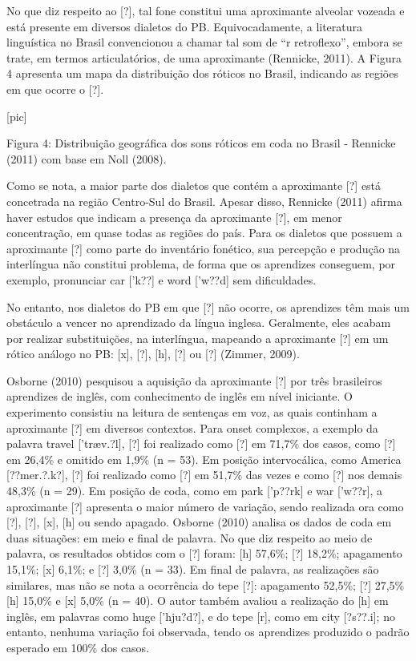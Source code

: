 No que diz respeito ao {[}?{]}, tal fone constitui uma aproximante
alveolar vozeada e est\'a presente em diversos dialetos do PB.
Equivocadamente, a literatura lingu\'istica no Brasil convencionou a
chamar tal som de ``r retroflexo'', embora se trate, em termos
articulat\'orios, de uma aproximante (Rennicke, 2011). A Figura 4
apresenta um mapa da distribui\c{c}\~ao dos r\'oticos no Brasil, indicando as
regi\~oes em que ocorre o {[}?{]}.

                                [pic]

Figura 4: Distribui\c{c}\~ao geogr\'afica dos sons r\'oticos em coda no Brasil -
Rennicke (2011) com base em Noll (2008).

Como se nota, a maior parte dos dialetos que cont\'em a aproximante
{[}?{]} est\'a concetrada na regi\~ao Centro-Sul do Brasil. Apesar disso,
Rennicke (2011) afirma haver estudos que indicam a presen\c{c}a da
aproximante {[}?{]}, em menor concentra\c{c}\~ao, em quase todas as regi\~oes do
pa\'is. Para os dialetos que possuem a aproximante {[}?{]} como parte do
invent\'ario fon\'etico, sua percep\c{c}\~ao e produ\c{c}\~ao na interl\'ingua n\~ao
constitui problema, de forma que os aprendizes conseguem, por exemplo,
pronunciar car {[}'k??{]} e word {[}'w??d{]} sem dificuldades.

No entanto, nos dialetos do PB em que {[}?{]} n\~ao ocorre, os aprendizes
t\^em mais um obst\'aculo a vencer no aprendizado da l\'ingua inglesa.
Geralmente, eles acabam por realizar substitui\c{c}\~oes, na interl\'ingua,
mapeando a aproximante {[}?{]} em um r\'otico an\'alogo no PB: {[}x{]},
{[}?{]}, {[}h{]}, {[}?{]} ou {[}?{]} (Zimmer, 2009).

Osborne (2010) pesquisou a aquisi\c{c}\~ao da aproximante {[}?{]} por tr\^es
brasileiros aprendizes de ingl\^es, com conhecimento de ingl\^es em n\'ivel
iniciante. O experimento consistiu na leitura de senten\c{c}as em voz, as
quais continham a aproximante {[}?{]} em diversos contextos. Para onset
complexos, a exemplo da palavra travel {[}'træv.?l{]}, {[}?{]} foi
realizado como {[}?{]} em 71,7\% dos casos, como {[}?{]} em 26,4\% e
omitido em 1,9\% (n = 53). Em posi\c{c}\~ao intervoc\'alica, como America
{[}??mer.?.k?{]}, {[}?{]} foi realizado como {[}?{]} em 51,7\% das vezes
e como {[}?{]} nos demais 48,3\% (n = 29). Em posi\c{c}\~ao de coda, como em
park {[}'p??rk{]} e war {[}'w??r{]}, a aproximante {[}?{]} apresenta o
maior n\'umero de varia\c{c}\~ao, sendo realizada ora como {[}?{]}, {[}?{]},
{[}x{]}, {[}h{]} ou sendo apagado. Osborne (2010) analisa os dados de
coda em duas situa\c{c}\~oes: em meio e final de palavra. No que diz respeito
ao meio de palavra, os resultados obtidos com o {[}?{]} foram: {[}h{]}
57,6\%; {[}?{]} 18,2\%; apagamento 15,1\%; {[}x{]} 6,1\%; e {[}?{]}
3,0\% (n = 33). Em final de palavra, as realiza\c{c}\~oes s\~ao similares, mas
n\~ao se nota a ocorr\^encia do tepe {[}?{]}: apagamento 52,5\%; {[}?{]}
27,5\% {[}h{]} 15,0\% e {[}x{]} 5,0\% (n = 40). O autor tamb\'em avaliou a
realiza\c{c}\~ao do {[}h{]} em ingl\^es, em palavras como huge {[}'hju?d?{]}, e
do tepe {[}r{]}, como em city {[}?s??.i{]}; no entanto, nenhuma varia\c{c}\~ao
foi observada, tendo os aprendizes produzido o padr\~ao esperado em 100\%
dos casos.

